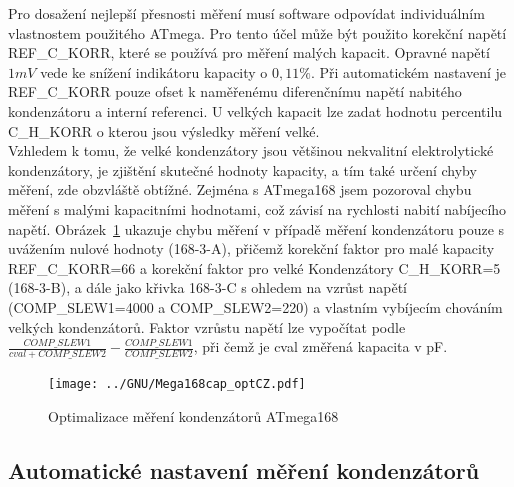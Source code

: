 Pro dosažení nejlepší přesnosti měření musí software odpovídat individuálním vlastnostem použitého ATmega.
Pro tento účel může být použito korekční napětí REF\_C\_KORR, které se používá pro měření malých kapacit.
Opravné napětí \(1mV\) vede ke snížení indikátoru kapacity o \(0,11\%\).
Při automatickém nastavení je REF\_C\_KORR pouze ofset k naměřenému diferenčnímu napětí nabitého kondenzátoru
a interní referenci.
U velkých kapacit lze zadat hodnotu percentilu C\_H\_KORR o kterou jsou výsledky měření velké.\\
Vzhledem k tomu, že velké kondenzátory jsou většinou nekvalitní elektrolytické kondenzátory, je zjištění
skutečné hodnoty kapacity, a tím také určení chyby měření, zde obzvláště obtížné.
Zejména s ATmega168 jsem pozoroval chybu měření s malými kapacitními hodnotami,
což závisí na rychlosti nabití nabíjecího napětí.
Obrázek~\ref{fig:mega168optcap}  ukazuje chybu měření v případě měření kondenzátoru pouze s uvážením
nulové hodnoty (168-3-A), přičemž korekční faktor pro malé kapacity REF\_C\_KORR=66 a korekční faktor pro velké
Kondenzátory C\_H\_KORR=5 (168-3-B), a dále jako křivka 168-3-C s ohledem na vzrůst napětí (COMP\_SLEW1=4000 a COMP\_SLEW2=220) a vlastním vybíjecím chováním velkých kondenzátorů.
Faktor vzrůstu napětí lze vypočítat podle \(\frac{COMP\_SLEW1}{cval+COMP\_SLEW2} - \frac{COMP\_SLEW1}{COMP\_SLEW2}\), při čemž je cval změřená kapacita v pF.

\begin{figure}[H]
\centering
\texttt{[image: ../GNU/Mega168cap\_optCZ.pdf]}
\caption{Optimalizace měření kondenzátorů ATmega168}
\label{fig:mega168optcap}
\end{figure}

\subsection{Automatické nastavení měření kondenzátorů}

